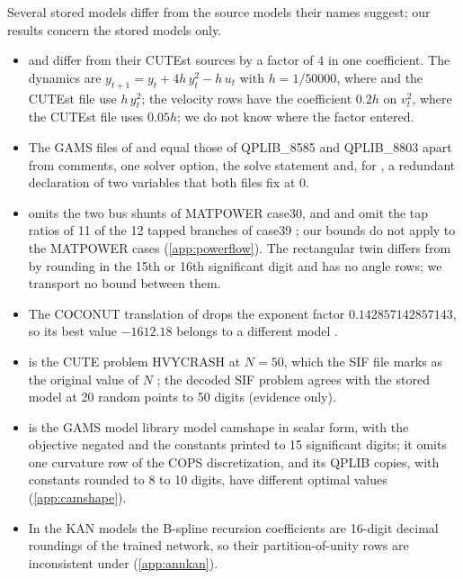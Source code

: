 Several stored models differ from the source models their names suggest; our results concern the stored models only.
\begin{itemize}\setlength{\itemsep}{0pt}\setlength{\parsep}{0pt}
\item {} and  differ from their CUTEst sources \citep{luksan2026-cutest-source-forms-for-dtoc5} by a factor of $4$ in one coefficient.
The  dynamics are $y_{t+1}=y_t+4h\,y_t^2-h\,u_t$ with $h=1/50000$, where \citet{coleman1993-the-global-convergence-of-a} and the CUTEst file use $h\,y_t^2$; the  velocity rows have the coefficient $0.2h$ on $v_t^2$, where the CUTEst file uses $0.05h$; we do not know where the factor entered.
\item The GAMS files of  and  equal those of QPLIB\_8585 and QPLIB\_8803 \citep{furini2018-qplib-a-library-of-quadratic} apart from comments, one solver option, the solve statement and, for , a redundant declaration of two variables that both files fix at $0$.
\item {} omits the two bus shunts of MATPOWER case30, and  and  omit the tap ratios of 11 of the 12 tapped branches of case39 \citep{matpower2026-minlplib-power-flow-and-water,zimmerman2011-matpower-steady-state-operations-planning}; our bounds do not apply to the MATPOWER cases (\cref{app:powerflow}).
The rectangular twin  differs from  by rounding in the 15th or 16th significant digit and has no angle rows; we transport no bound between them.
\item The COCONUT translation of  drops the exponent factor $0.142857142857143$, so its best value $-1612.18$ belongs to a different model \citep{coconut2026-globallib-gams-coconut-and-minlplib}.
\item {} is the CUTE problem HVYCRASH at $N=50$, which the SIF file marks as the original value of $N$ \citep{toint2013-cute-hvycrash-source-sif-files}; the decoded SIF problem agrees with the stored model at 20 random points to 50 digits (evidence only).
\item {} is the GAMS model library model camshape \citep{library2026-cops-and-gams-source-models} in scalar form, with the objective negated and the constants printed to 15 significant digits; it omits one curvature row of the COPS discretization, and its QPLIB copies, with constants rounded to 8 to 10 digits, have different optimal values (\cref{app:camshape}).
\item In the KAN models the B-spline recursion coefficients are 16-digit decimal roundings of the trained network, so their partition-of-unity rows are inconsistent under  (\cref{app:annkan}).
\end{itemize}
